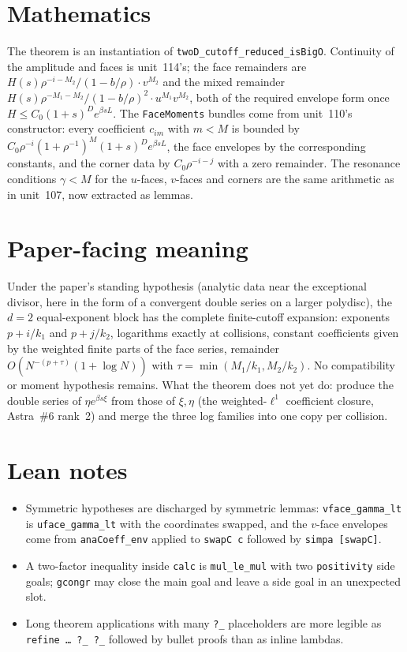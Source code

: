 \documentclass[11pt]{article}
\begin{document}
\section{Mathematics}

The theorem is an instantiation of \texttt{twoD\_cutoff\_reduced\_isBigO}. Continuity of the amplitude
and faces is unit~114's; the face remainders are $H(s)\rho^{-i-M_2}/(1-b/\rho)\cdot v^{M_2}$ and the
mixed remainder $H(s)\rho^{-M_1-M_2}/(1-b/\rho)^2\cdot u^{M_1}v^{M_2}$, both of the required envelope
form once $H\le C_0(1+s)^De^{\beta sL}$. The \texttt{FaceMoments} bundles come from unit~110's
constructor: every coefficient $c_{im}$ with $m<M$ is bounded by
$C_0\rho^{-i}(1+\rho^{-1})^M(1+s)^De^{\beta sL}$, the face envelopes by the corresponding constants,
and the corner data by $C_0\rho^{-i-j}$ with a zero remainder. The resonance conditions
$\gamma<M$ for the $u$-faces, $v$-faces and corners are the same arithmetic as in unit~107, now
extracted as lemmas.

\section{Paper-facing meaning}

Under the paper's standing hypothesis (analytic data near the exceptional divisor, here in the form of
a convergent double series on a larger polydisc), the $d=2$ equal-exponent block has the complete
finite-cutoff expansion: exponents $p+i/k_1$ and $p+j/k_2$, logarithms exactly at collisions, constant
coefficients given by the weighted finite parts of the face series, remainder
$O(N^{-(p+\tau)}(1+\log N))$ with $\tau=\min(M_1/k_1,M_2/k_2)$. No compatibility or moment hypothesis
remains. What the theorem does not yet do: produce the double series of $\eta e^{\beta s\xi}$ from those of
$\xi,\eta$ (the weighted-$\ell^1$ coefficient closure, Astra~\#6 rank~2) and merge the three log
families into one copy per collision.

\section{Lean notes}

\begin{itemize}
\item Symmetric hypotheses are discharged by symmetric lemmas: \texttt{vface\_gamma\_lt} is
\texttt{uface\_gamma\_lt} with the coordinates swapped, and the $v$-face envelopes come from
\texttt{anaCoeff\_env} applied to \texttt{swapC c} followed by \texttt{simpa [swapC]}.
\item A two-factor inequality inside \texttt{calc} is \texttt{mul\_le\_mul} with two
\texttt{positivity} side goals; \texttt{gcongr} may close the main goal and leave a side goal in
an unexpected slot.
\item Long theorem applications with many \texttt{?\_} placeholders are more legible as
\texttt{refine … ?\_ ?\_} followed by bullet proofs than as inline lambdas.
\end{itemize}
\end{document}
